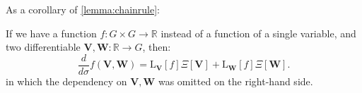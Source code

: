As a corollary of \cref{lemma:chainrule}:

\begin{corollary} \label{corol:corol1} If we have a function $f: G \times G \to \mathbb{R}$ instead of a function of a single variable, and two differentiable $\mathbf{V}, \mathbf{W} : \mathbb{R} \to G$, then:
\begin{equation}
   \frac{d}{d \sigma} f(\mathbf{V},\mathbf{W}) {=} \text{L}_{\mathbf{V}}[f] \Xi[\mathbf{V}] {+} \text{L}_{\mathbf{W}}[f] \Xi[\mathbf{W}].
\end{equation}
in which the dependency on $\mathbf{V}, \mathbf{W}$ was omitted on the right-hand side. 
\end{corollary}

